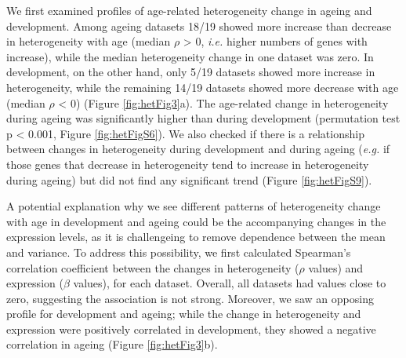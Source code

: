 \documentclass[12pt,twoside]{unicam}
\begin{document}
We first examined profiles of age-related heterogeneity change in ageing and development. Among ageing datasets 18/19 showed more increase than decrease in heterogeneity with age (median \(\rho\) \textgreater{} 0, \emph{i.e.} higher numbers of genes with increase), while the median heterogeneity change in one dataset was zero. In development, on the other hand, only 5/19 datasets showed more increase in heterogeneity, while the remaining 14/19 datasets showed more decrease with age (median \(\rho\) \textless{} 0) (Figure \ref{fig:hetFig3}a). The age-related change in heterogeneity during ageing was significantly higher than during development (permutation test p \textless{} 0.001, Figure \ref{fig:hetFigS6}). We also checked if there is a relationship between changes in heterogeneity during development and during ageing (\emph{e.g.} if those genes that decrease in heterogeneity tend to increase in heterogeneity during ageing) but did not find any significant trend (Figure \ref{fig:hetFigS9}).

A potential explanation why we see different patterns of heterogeneity change with age in development and ageing could be the accompanying changes in the expression levels, as it is challengeing to remove dependence between the mean and variance. To address this possibility, we first calculated Spearman's correlation coefficient between the changes in heterogeneity (\(\rho\) values) and expression (\(\beta\) values), for each dataset. Overall, all datasets had values close to zero, suggesting the association is not strong. Moreover, we saw an opposing profile for development and ageing; while the change in heterogeneity and expression were positively correlated in development, they showed a negative correlation in ageing (Figure \ref{fig:hetFig3}b).
\end{document}
